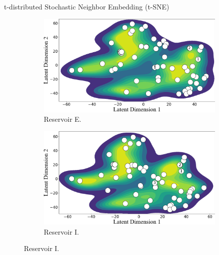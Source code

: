 \begin{frame}{t-distributed Stochastic Neighbor Embedding (t-SNE)}
	\begin{figure}[htbp]
		\centering
		\tiny
		\begin{subfigure}[t]{0.38\columnwidth}
			\centering
			\includegraphics[width=\columnwidth]{chp_sogp/figures/TSNE_task4_kde_p30.png}
			\caption{Reservoir E.}
		\end{subfigure}
		\hspace{0.05\columnwidth} %
		\begin{subfigure}[t]{0.38\columnwidth}
			\centering
			\includegraphics[width=\columnwidth]{chp_sogp/figures/TSNE_task8_kde_p30.png}
			\caption{Reservoir I.}
		\end{subfigure}
		
		\vspace{-0.4em} %
		

\end{figure}
\end{frame}
